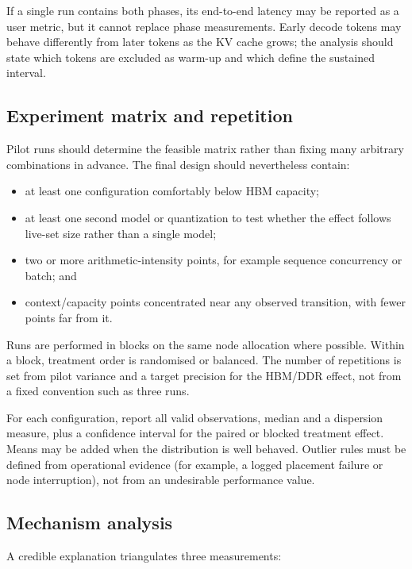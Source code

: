 If a single run contains both phases, its end-to-end latency may be
reported as a user metric, but it cannot replace phase measurements.
Early decode tokens may behave differently from later tokens as the KV
cache grows; the analysis should state which tokens are excluded as
warm-up and which define the sustained interval.

\subsection{Experiment matrix and repetition}

Pilot runs should determine the feasible matrix rather than fixing many
arbitrary combinations in advance.  The final design should nevertheless
contain:

\begin{itemize}
  \item at least one configuration comfortably below HBM capacity;
  \item at least one second model or quantization to test whether the
        effect follows live-set size rather than a single model;
  \item two or more arithmetic-intensity points, for example sequence
        concurrency or batch; and
  \item context/capacity points concentrated near any observed
        transition, with fewer points far from it.
\end{itemize}

Runs are performed in blocks on the same node allocation where
possible.  Within a block, treatment order is randomised or balanced.
The number of repetitions is set from pilot variance and a target
precision for the HBM/DDR effect, not from a fixed convention such as
three runs.

For each configuration, report all valid observations, median and a
dispersion measure, plus a confidence interval for the paired or
blocked treatment effect.  Means may be added when the distribution is
well behaved.  Outlier rules must be defined from operational evidence
(for example, a logged placement failure or node interruption), not
from an undesirable performance value.

\subsection{Mechanism analysis}

A credible explanation triangulates three measurements:

